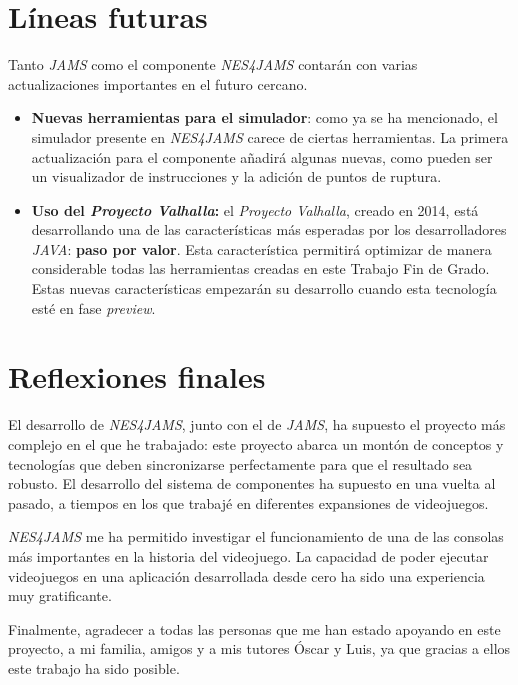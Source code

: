 \section{Líneas futuras}\label{sec:líneas-futuras}

Tanto \textit{JAMS} como el componente \textit{NES4JAMS}
contarán con varias actualizaciones importantes en
el futuro cercano.

\begin{itemize}
    \item \textbf{Nuevas herramientas para el simulador}:
    como ya se ha mencionado, el simulador presente en
    \textit{NES4JAMS} carece de ciertas herramientas.
    La primera actualización para el componente añadirá
    algunas nuevas, como pueden ser un visualizador
    de instrucciones y la adición de puntos de ruptura.
    \item \textbf{Uso del \textit{Proyecto Valhalla}:} el
    \textit{Proyecto Valhalla}\cite{PROJECT_VALHALLA}, creado en 2014,
    está desarrollando una de las características más esperadas
    por los desarrolladores \textit{JAVA}: \textbf{paso por valor}.
    Esta característica permitirá optimizar de manera considerable
    todas las herramientas creadas en este Trabajo Fin
    de Grado.
    Estas nuevas características empezarán su desarrollo cuando esta
    tecnología esté en fase \textit{preview}.
\end{itemize}

\section{Reflexiones finales}\label{sec:reflexiones-finales}

El desarrollo de \textit{NES4JAMS}, junto con el
de \textit{JAMS}, ha supuesto el proyecto más complejo en el
que he trabajado:
este proyecto abarca un montón de conceptos y tecnologías
que deben sincronizarse perfectamente para que el resultado
sea robusto.
El desarrollo del sistema de componentes ha supuesto en una
vuelta al pasado, a tiempos en los que trabajé
en diferentes expansiones de videojuegos.

\textit{NES4JAMS} me ha permitido investigar el funcionamiento
de una de las consolas más importantes en la
historia del videojuego.
La capacidad de poder ejecutar videojuegos en una aplicación
desarrollada desde cero ha sido una experiencia muy gratificante.

Finalmente, agradecer a todas las personas que me han
estado apoyando en este proyecto, a mi familia, amigos y a mis
tutores Óscar y Luis, ya que gracias a ellos este trabajo
ha sido posible.
